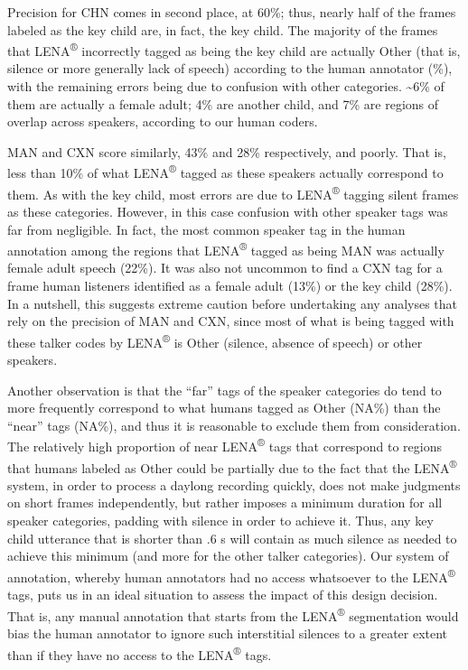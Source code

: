 \documentclass[english,table,man,floatsintext]{apa6}
\begin{document}
Precision for CHN comes in second place, at 60\%; thus, nearly half of
the frames labeled as the key child are, in fact, the key child. The
majority of the frames that LENA\textsuperscript{®} incorrectly tagged
as being the key child are actually Other (that is, silence or more
generally lack of speech) according to the human annotator (\%), with
the remaining errors being due to confusion with other categories.
\textasciitilde{}6\% of them are actually a female adult; 4\% are
another child, and 7\% are regions of overlap across speakers, according
to our human coders.

MAN and CXN score similarly, 43\% and 28\% respectively, and poorly.
That is, less than 10\% of what LENA\textsuperscript{®} tagged as these
speakers actually correspond to them. As with the key child, most errors
are due to LENA\textsuperscript{®} tagging silent frames as these
categories. However, in this case confusion with other speaker tags was
far from negligible. In fact, the most common speaker tag in the human
annotation among the regions that LENA\textsuperscript{®} tagged as
being MAN was actually female adult speech (22\%). It was also not
uncommon to find a CXN tag for a frame human listeners identified as a
female adult (13\%) or the key child (28\%). In a nutshell, this
suggests extreme caution before undertaking any analyses that rely on
the precision of MAN and CXN, since most of what is being tagged with
these talker codes by LENA\textsuperscript{®} is Other (silence, absence
of speech) or other speakers.

Another observation is that the \enquote{far} tags of the speaker
categories do tend to more frequently correspond to what humans tagged
as Other (NA\%) than the \enquote{near} tags (NA\%), and thus it is
reasonable to exclude them from consideration. The relatively high
proportion of near LENA\textsuperscript{®} tags that correspond to
regions that humans labeled as Other could be partially due to the fact
that the LENA\textsuperscript{®} system, in order to process a daylong
recording quickly, does not make judgments on short frames
independently, but rather imposes a minimum duration for all speaker
categories, padding with silence in order to achieve it. Thus, any key
child utterance that is shorter than .6 s will contain as much silence
as needed to achieve this minimum (and more for the other talker
categories). Our system of annotation, whereby human annotators had no
access whatsoever to the LENA\textsuperscript{®} tags, puts us in an
ideal situation to assess the impact of this design decision. That is,
any manual annotation that starts from the LENA\textsuperscript{®}
segmentation would bias the human annotator to ignore such interstitial
silences to a greater extent than if they have no access to the
LENA\textsuperscript{®} tags.
\end{document}
